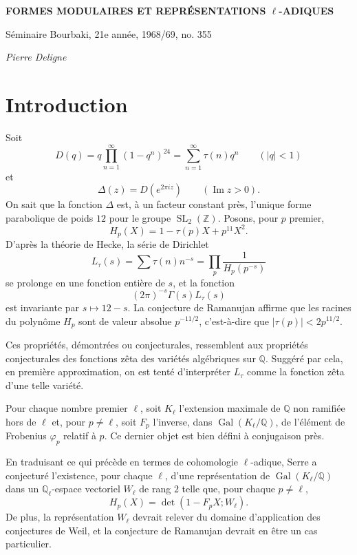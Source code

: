 \documentclass[10pt]{article}
\newcommand{\Q}{\mathbb Q}
\newcommand{\Z}{\mathbb Z}
\newcommand{\SL}{\operatorname{SL}}
\newcommand{\Gal}{\operatorname{Gal}}
\begin{document}
\begin{center}
{\Large\bfseries FORMES MODULAIRES ET REPRÉSENTATIONS $\ell$-ADIQUES}\par
\vspace{0.35em}
{\large Séminaire Bourbaki, 21e année, 1968/69, no. 355}\par
\vspace{0.7em}
{\itshape Pierre Deligne}
\end{center}

\section{Introduction}

Soit
\[
D(q)=q\prod_{n=1}^{\infty}(1-q^n)^{24}
     =\sum_{n=1}^{\infty}\tau(n)q^n
\qquad (|q|<1)
\]
et
\[
\Delta(z)=D(e^{2\pi iz})\qquad (\operatorname{Im} z>0).
\]
On sait que la fonction $\Delta$ est, à un facteur constant près, l'unique forme parabolique
de poids $12$ pour le groupe $\SL_2(\Z)$. Posons, pour $p$ premier,
\[
H_p(X)=1-\tau(p)X+p^{11}X^2 .
\]
D'après la théorie de Hecke, la série de Dirichlet
\[
L_\tau(s)=\sum \tau(n)n^{-s}=\prod_p\frac{1}{H_p(p^{-s})}
\]
se prolonge en une fonction entière de $s$, et la fonction
\[
(2\pi)^{-s}\Gamma(s)L_\tau(s)
\]
est invariante par $s\mapsto 12-s$. La conjecture de Ramanujan affirme que les racines
du polynôme $H_p$ sont de valeur absolue $p^{-11/2}$, c'est-à-dire que
$|\tau(p)|<2p^{11/2}$.

Ces propriétés, démontrées ou conjecturales, ressemblent aux propriétés conjecturales
des fonctions zêta des variétés algébriques sur $\Q$. Suggéré par cela, en première
approximation, on est tenté d'interpréter $L_\tau$ comme la fonction zêta d'une telle
variété.

Pour chaque nombre premier $\ell$, soit $K_\ell$ l'extension maximale de $\Q$ non
ramifiée hors de $\ell$ et, pour $p\ne\ell$, soit $F_p$ l'inverse, dans $\Gal(K_\ell/\Q)$,
de l'élément de Frobenius $\varphi_p$ relatif à $p$. Ce dernier objet est bien défini à
conjugaison près.

En traduisant ce qui précède en termes de cohomologie $\ell$-adique, Serre a conjecturé
l'existence, pour chaque $\ell$, d'une représentation de $\Gal(K_\ell/\Q)$ dans un
$\Q_\ell$-espace vectoriel $W_\ell$ de rang $2$ telle que, pour chaque $p\ne\ell$,
\[
H_p(X)=\det(1-F_pX;W_\ell).
\]
De plus, la représentation $W_\ell$ devrait relever du domaine d'application des
conjectures de Weil, et la conjecture de Ramanujan devrait en être un cas particulier.
\end{document}
